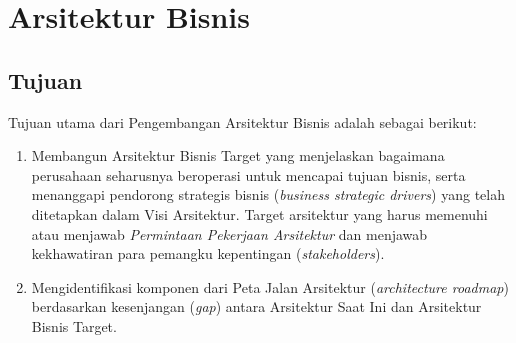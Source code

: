\chapter{Arsitektur Bisnis}

\section{Tujuan}
Tujuan utama dari Pengembangan Arsitektur Bisnis adalah sebagai berikut:
\begin{enumerate}
	\item Membangun Arsitektur Bisnis Target yang menjelaskan bagaimana perusahaan seharusnya beroperasi untuk mencapai tujuan bisnis, serta menanggapi pendorong strategis bisnis (\textit{business strategic drivers}) yang telah ditetapkan dalam Visi Arsitektur. Target arsitektur yang harus memenuhi atau menjawab \textit{Permintaan Pekerjaan Arsitektur} dan menjawab kekhawatiran para pemangku kepentingan (\textit{stakeholders}).
	\item Mengidentifikasi komponen dari Peta Jalan Arsitektur (\textit{architecture roadmap}) berdasarkan kesenjangan (\textit{gap}) antara Arsitektur Saat Ini dan Arsitektur Bisnis Target.
\end{enumerate}

